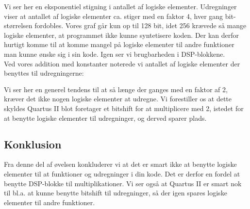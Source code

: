 \documentclass[../journal2.tex]{subfiles}
\begin{document}


Vi ser her en eksponentiel stigning i antallet af logiske elementer. Udregninger viser at antallet af logiske elementer ca. stiger med en faktor 4, hver gang bit-størrelsen fordobles. Vores graf går kun op til 128 bit, idet 256 krævede så mange logiske elementer, at programmet ikke kunne syntetisere koden. Der kan derfor hurtigt komme til at komme mangel på logiske elementer til andre funktioner man kunne ønske sig i sin kode. Igen ser vi brugbarheden i DSP-blokkene.\\

Ved vores addition med konstanter noterede vi antallet af logiske elementer der benyttes til udregningerne:


Vi ser her en generel tendens til at så længe der ganges med en faktor af 2, kræver det ikke nogen logiske elementer at udregne. Vi forestiller os at dette skyldes Quartus II blot foretager et bitshift for at multiplicere med 2, istedet for at benytte logiske elementer til udregninger, og derved sparer plads.

\subsection{Konklusion}

Fra denne del af øvelsen konkluderer vi at det er smart ikke at benytte logiske elementer til at funktioner og udregninger i din kode. Det er derfor en fordel at benytte DSP-blokke til multiplikationer. Vi ser også at Quartus II er smart nok til bl.a. at kunne benytte bitshift til udregninger, så der igen spares logiske elementer til andre funktioner.
\end{document}
